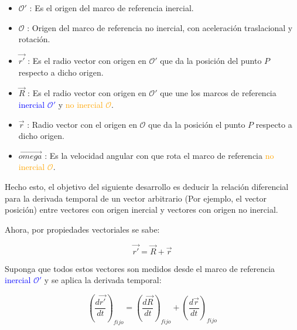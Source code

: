 \documentclass[/home/hernan-barquero/Documents/Apuntes_mecanica_teorica/main.tex]{subfiles}
\begin{document}
	\begin{itemize}
		\item ${\mathcal{O}}'$ : Es el origen del marco de referencia inercial.
		\item $\mathcal{O}$ : Origen del marco de referencia no inercial, con aceleración traslacional y rotación.
		\item $\vec{{r}'}$ : Es el radio vector con origen en ${\mathcal{O}}'$ que da la posición del punto $P$ respecto a dicho origen.
		\item $\vec{R}$ : Es el radio vector con origen en ${\mathcal{O}}'$ que une los marcos de referencia  \textcolor{blue}{inercial ${\mathcal{O}}'$} y \textcolor{orange}{no inercial $\mathcal{O}$}.
		\item $\vec{r}$ :  Radio vector con el origen en $\mathcal{O}$ que da la posición el punto $P$ respecto a dicho origen.
		\item $\vec{omega}$ : Es la velocidad angular con que rota el marco de referencia  \textcolor{orange}{no inercial $\mathcal{O}$}.
	\end{itemize}

	Hecho esto, el objetivo del siguiente desarrollo es deducir la relación diferencial para la derivada temporal de un vector arbitrario (Por ejemplo, el vector posición) entre vectores con origen inercial y vectores con origen no inercial.

	Ahora, por propiedades vectoriales se sabe:

	\begin{equation}
		\vec{{r}'} = \vec{R} + \vec{r}
		\label{eq: posiciondosmarcos}
	\end{equation}

	Suponga que todos estos vectores son medidos desde el marco de referencia  \textcolor{blue}{inercial ${\mathcal{O}}'$} y se aplica la derivada temporal:

	\begin{equation}
		\left( \frac{d \vec{{r}'}}{dt} \right)_{fijo} = \left( \frac{d \vec{R}}{dt} \right)_{fijo} + \left( \frac{d \vec{r}}{dt} \right)_{fijo}
		\label{eq: velocidaddosmarcos}
	\end{equation} 
\end{document}
